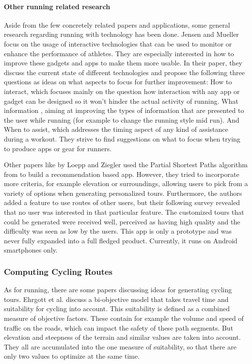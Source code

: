 \paragraph{Other running related research}
Aside from the few concretely related papers and applications, some general research regarding running with technology has been done.
Jensen and Mueller focus on the usage of interactive technologies that can be used to monitor or enhance the performance of athletes.
They are especially interested in how to improve these gadgets and apps to make them more usable. 
In their paper, they discuss the current state of different technologies and propose the following three questions as ideas on what aspects to focus for further improvement:
\glqq How to interact\grqq , which focuses mainly on the question how interaction with any app or gadget can be designed so it won't hinder the actual activity of running.
\glqq What information \grqq , aiming at improving the types of information that are presented to the user while running (for example to change the running style mid run).
And \glqq When to assist\grqq , which addresses the timing aspect of any kind of assistance during a workout. 
They strive to find suggestions on what to focus when trying to produce apps or gear for runners.

Other papers like \cite{loepp_recommending_nodate} by Loepp and Ziegler used the Partial Shortest Paths algorithm from \cite{gemsa_efficient_2013} to build a recommendation based app.
However, they tried to incorporate more criteria, for example elevation or surroundings, allowing users to pick from a variety of options when generating personalized tours. 
Furthermore, the authors added a feature to use routes of other users, but their following survey revealed that no user was interested in that particular feature.
The customized tours that could be generated were received well, perceived as having high quality and the difficulty was seen as low by the users.
This app is only a prototype and was never fully expanded into a full fledged product.
Currently, it runs on Android smartphones only. 



\subsubsection{Computing Cycling Routes}
\label{subsubsec:cyclingRoutes}
As for running, there are some papers discussing ideas for generating cycling tours.
Ehrgott et al. discuss a bi-objective model that takes travel time and \glqq suitability for cycling\grqq{} into account.
This suitability is defined as a combined measure of objective factors. 
These contain for example the volume and speed of traffic on the roads, which can impact the safety of these path segments. 
But elevation and steepness of the terrain and similar values are taken into account.
They all are accumulated into the one measure of suitability, so that there are only two values to optimize at the same time. \cite{ehrgott_bi-objective_2012} 

